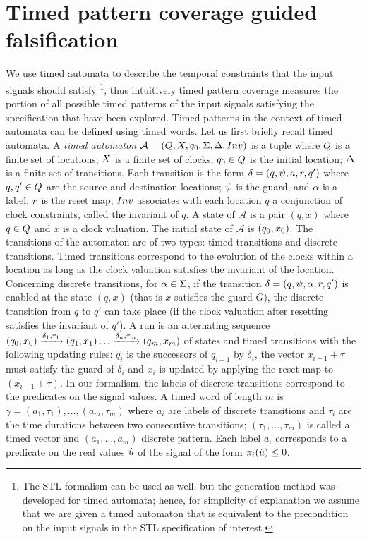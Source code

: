 \section{Timed pattern coverage guided falsification} \label{sec:specCov}
We use timed automata  to describe the temporal constraints that the input signals should satisfy \footnote{The STL formalism can be used as well, but the generation method was developed for timed automata; hence, for simplicity of explanation we assume that we are given a timed automaton that is equivalent to the precondition on the input signals in the STL specification of interest.}, thus intuitively timed pattern coverage measures the portion of all possible timed patterns of the input signals satisfying the specification that have been explored. Timed patterns in the context of timed automata can be defined using timed words. Let us first briefly recall timed automata. A \emph{timed automaton} $\mathcal{A} = (Q, X, q_{0}, \Sigma, \Delta, Inv)$ is a tuple where $Q$ is a finite set of locations; $X$ is a finite set of clocks; $q_{0} \in Q$ is the initial location; $\Delta$ is a finite set of transitions. Each transition is the form $\delta = (q,\psi,a, r,q')$ where $q, q' \in Q$ are the source and destination locations; $\psi$ is the guard, and $\alpha$ is a label; $r$ is the reset map; $Inv$ associates with each location $q$ a conjunction of clock constraints, called the invariant of $q$. A state of $\mathcal{A}$ is a pair $(q,x)$ where $q \in Q$ and $x$ is a clock valuation. The initial state of $\mathcal{A}$ is $(q_{0}, x_0)$. The transitions of the automaton are of two types: timed transitions and discrete transitions. Timed transitions correspond to the evolution of the clocks within a location as long as the clock valuation satisfies the invariant of the location. Concerning discrete transitions, for $\alpha \in \Sigma$, if the transition $\delta = (q,\psi,\alpha,r,q')$ is enabled at the state $(q, x)$ (that is $x$ satisfies the guard $G$), the discrete transition from $q$ to $q'$ can take place (if the clock valuation after resetting satisfies the invariant of $q'$). A run is an alternating sequence $(q_{0},x_0)\xrightarrow{\delta_1,\tau_1}(q_1,x_1)\ldots \xrightarrow{\delta_n,\tau_m}(q_m,x_m)$ of states and timed transitions with the following updating rules: $q_{i}$ is the successors of $q_{i-1}$ by $\delta_i$, the vector $x_{i-1}+\tau$ must satisfy the guard of $\delta_i$ and $x_i$ is updated by applying the reset map to $(x_{i-1}+\tau)$. In our formalism, the labels of discrete transitions correspond to the predicates on the signal values. A timed word of length $m$ is $\gamma = (a_1, \tau_1), \ldots, (a_m, \tau_m)$ where $a_i$ are labels of discrete transitions and $\tau_i$ are the time durations between two consecutive transitions; $(\tau_1, \ldots, \tau_m)$ is called a timed vector and $(a_1, \ldots, a_m)$ discrete pattern. Each label $a_i$ corresponds to a predicate on the real values $\hat{u}$ of the signal of the form $\pi_i(\hat{u}) \le 0$. 

